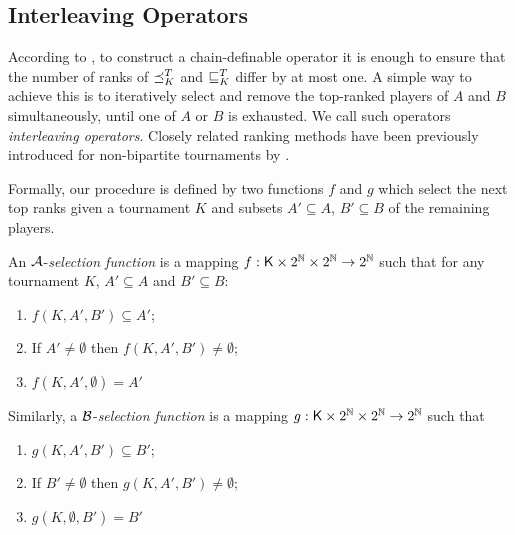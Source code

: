 \subsection{Interleaving Operators}
\label{tourn_sec_interleaving}

According to , to construct a
chain-definable operator it is enough to ensure that the number of ranks of
$\preceq_K^T$ and $\sqsubseteq_K^T$ differ by at most one. A simple way to achieve
this is to iteratively select and remove the top-ranked players of $A$ and $B$
simultaneously, until one of $A$ or $B$ is exhausted. We call such operators
\emph{interleaving operators}. Closely related ranking methods have been
previously introduced for non-bipartite tournaments by
\textcite{bouyssou2004monotonicity}.

Formally, our procedure is defined by two functions $f$ and $g$ which select
the next top ranks given a tournament $K$ and subsets $A' \subseteq A$, $B'
\subseteq B$ of the remaining players.

\begin{definition}%
    \label{tourn_def_selectionfunction}

     An $\mathcal{A}$-\emph{selection function} is a mapping $f: \mathsf{K} \times 2^{\mathbb{N}} \times
     2^{\mathbb{N}} \to 2^{\mathbb{N}}$ such that for any tournament $K$, $A' \subseteq A$ and $B'
     \subseteq B$:
    \begin{enumerate}
        \item \label{tourn_item_f_sel_1} $f(K, A', B') \subseteq A'$;
        \item \label{tourn_item_f_sel_2} If $A' \ne \emptyset$ then $f(K, A', B') \ne
              \emptyset$;
        \item \label{tourn_item_f_sel_3} $f(K, A', \emptyset) = A'$
    \end{enumerate}

    Similarly, a $\mathcal{B}$-\emph{selection function} is a mapping $g: \mathsf{K} \times 2^{\mathbb{N}}
    \times 2^{\mathbb{N}} \to 2^{\mathbb{N}}$ such that
    \begin{enumerate}
        \item \label{tourn_item_g_sel_1} $g(K, A', B') \subseteq B'$;
        \item \label{tourn_item_g_sel_2} If $B' \ne \emptyset$ then $g(K, A', B') \ne
              \emptyset$;
        \item \label{tourn_item_g_sel_3} $g(K, \emptyset, B') = B'$
    \end{enumerate}

\end{definition}

